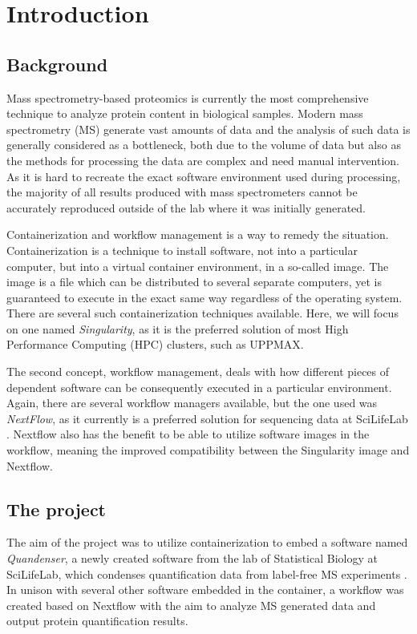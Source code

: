 \section{Introduction}

\subsection{Background}
Mass spectrometry-based proteomics is currently the most comprehensive technique to analyze protein content in biological samples. Modern mass spectrometry (MS) generate vast amounts of data and the analysis of such data is generally considered as a bottleneck, both due to the volume of data but also as the methods for processing the data are complex and need manual intervention. As it is hard to recreate the exact software environment used during processing, the majority of all results produced with mass spectrometers cannot be accurately reproduced outside of the lab where it was initially generated.

Containerization and workflow management is a way to remedy the situation. Containerization is a technique to install software, not into a particular computer, but into a virtual container environment, in a so-called image. The image is a file which can be distributed to several separate computers, yet is guaranteed to execute in the exact same way regardless of the operating system. There are several such containerization techniques available. Here, we will focus on one named \textit{Singularity}, as it is the preferred solution of most High Performance Computing (HPC) clusters, such as UPPMAX. \cite{singularity, singularity-uppmax}

The second concept, workflow management, deals with how different pieces of dependent software can be consequently executed in a particular environment. Again, there are several workflow managers available, but the one used was \textit{NextFlow}, as it currently is a preferred solution for sequencing data at SciLifeLab \cite{nextflow}. Nextflow also has the benefit to be able to utilize software images in the workflow, meaning the improved compatibility between the Singularity image and Nextflow.

\subsection{The project}
The aim of the project was to utilize containerization to embed a software named \textit{Quandenser}, a newly created software from the lab of Statistical Biology at SciLifeLab, which condenses quantification data from label-free MS experiments \cite{quandenser}. In unison with several other software embedded in the container, a workflow was created based on Nextflow with the aim to analyze MS generated data and output protein quantification results.

